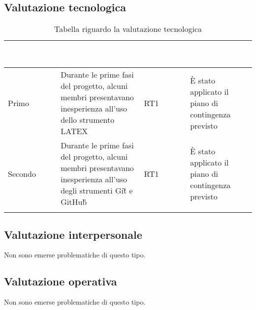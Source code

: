 \subsection{Valutazione tecnologica}
{
    \setlength{\freewidth}{\dimexpr\textwidth-10\tabcolsep}
    \renewcommand{\arraystretch}{1.5}
    \centering
    \setlength{\aboverulesep}{0pt}
    \setlength{\belowrulesep}{0pt}
    \begin{longtable}{C{.16\freewidth} C{.38\freewidth} C{.14\freewidth} C{.38\freewidth}}
       \toprule
    \textcolor{white}{\textbf{Incremento}}&
    \textcolor{white}{\textbf{Problema emerso}}&
    \textcolor{white}{\textbf{Rischio associato}}&
    \textcolor{white}{\textbf{Soluzione migliorativa}}\\	
    \toprule
    \endhead
    
Primo & Durante le prime fasi del progetto, alcuni membri presentavano inesperienza all'uso dello strumento LATEX & RT1 & È stato applicato il piano di contingenza
previsto \\
Secondo & Durante le prime fasi del progetto, alcuni membri presentavano inesperienza all'uso degli strumenti Git\G{} e GitHub\G{} & RT1 & È stato applicato il piano di contingenza
previsto\\

 \bottomrule
 \caption{Tabella riguardo la valutazione tecnologica}
\end{longtable}
}

\subsection{Valutazione interpersonale}
Non sono emerse problematiche di questo tipo. 

\subsection{Valutazione operativa}
Non sono emerse problematiche di questo tipo.
